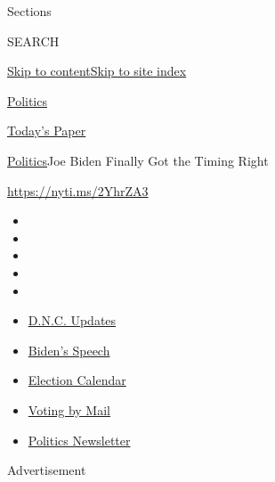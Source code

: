 Sections

SEARCH

\protect\hyperlink{site-content}{Skip to
content}\protect\hyperlink{site-index}{Skip to site index}

\href{https://www.nytimes3xbfgragh.onion/section/politics}{Politics}

\href{https://myaccount.nytimes3xbfgragh.onion/auth/login?response_type=cookie\&client_id=vi}{}

\href{https://www.nytimes3xbfgragh.onion/section/todayspaper}{Today's
Paper}

\href{/section/politics}{Politics}\textbar{}Joe Biden Finally Got the
Timing Right

\url{https://nyti.ms/2YhrZA3}

\begin{itemize}
\item
\item
\item
\item
\item
\end{itemize}

\begin{itemize}
\item
  \href{https://www.nytimes3xbfgragh.onion/live/2020/08/20/us/dnc-convention-election?action=click\&pgtype=Article\&state=default\&region=TOP_BANNER\&context=storylines_menu}{D.N.C.
  Updates}
\item
  \href{https://www.nytimes3xbfgragh.onion/2020/08/20/us/politics/biden-presidential-nomination-dnc.html?action=click\&pgtype=Article\&state=default\&region=TOP_BANNER\&context=storylines_menu}{Biden's
  Speech}
\item
  \href{https://www.nytimes3xbfgragh.onion/interactive/2019/us/elections/2020-presidential-election-calendar.html?action=click\&pgtype=Article\&state=default\&region=TOP_BANNER\&context=storylines_menu}{Election
  Calendar}
\item
  \href{https://www.nytimes3xbfgragh.onion/interactive/2020/08/11/us/politics/vote-by-mail-us-states.html?action=click\&pgtype=Article\&state=default\&region=TOP_BANNER\&context=storylines_menu}{Voting
  by Mail}
\item
  \href{https://www.nytimes3xbfgragh.onion/newsletters/politics?action=click\&pgtype=Article\&state=default\&region=TOP_BANNER\&context=storylines_menu}{Politics
  Newsletter}
\end{itemize}

Advertisement


